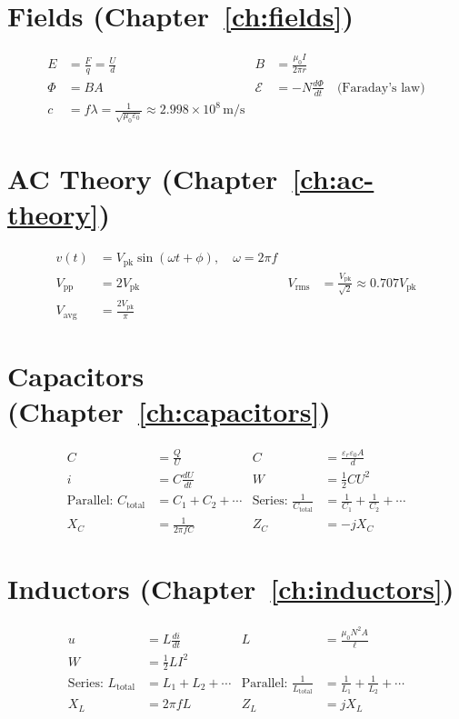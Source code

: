 \section*{Fields (Chapter~\ref{ch:fields})}
\begin{align*}
E &= \frac{F}{q} = \frac{U}{d} & B &= \frac{\mu_0 I}{2\pi r} \\
\Phi &= BA & \mathcal{E} &= -N\frac{d\Phi}{dt}\quad\text{(Faraday's law)} \\
c &= f\lambda = \frac{1}{\sqrt{\mu_0\varepsilon_0}} \approx 2.998\times10^8\,\text{m/s}
\end{align*}

\section*{AC Theory (Chapter~\ref{ch:ac-theory})}
\begin{align*}
v(t) &= V_{\text{pk}}\sin(\omega t+\phi), \quad \omega = 2\pi f \\
V_{\text{pp}} &= 2V_{\text{pk}} & V_{\text{rms}} &= \frac{V_{\text{pk}}}{\sqrt2} \approx 0.707V_{\text{pk}} \\
V_{\text{avg}} &= \frac{2V_{\text{pk}}}{\pi}
\end{align*}

\section*{Capacitors (Chapter~\ref{ch:capacitors})}
\begin{align*}
C &= \frac{Q}{U} & C &= \frac{\varepsilon_r\varepsilon_0 A}{d} \\
i &= C\frac{dU}{dt} & W &= \frac12CU^2 \\
\text{Parallel: } C_{\text{total}} &= C_1+C_2+\cdots &
\text{Series: } \frac{1}{C_{\text{total}}} &= \frac{1}{C_1}+\frac{1}{C_2}+\cdots \\
X_C &= \frac{1}{2\pi fC} & Z_C &= -jX_C
\end{align*}

\section*{Inductors (Chapter~\ref{ch:inductors})}
\begin{align*}
u &= L\frac{di}{dt} & L &= \frac{\mu_0N^2A}{\ell} \\
W &= \frac12LI^2 \\
\text{Series: } L_{\text{total}} &= L_1+L_2+\cdots &
\text{Parallel: } \frac{1}{L_{\text{total}}} &= \frac{1}{L_1}+\frac{1}{L_2}+\cdots \\
X_L &= 2\pi fL & Z_L &= jX_L
\end{align*}

